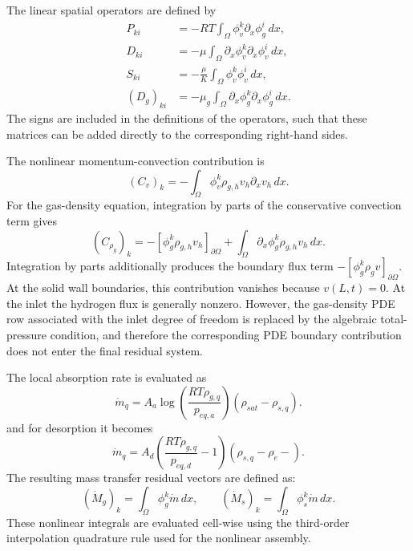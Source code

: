 The linear spatial operators are defined by
\begin{align}
P_{ki} &= -RT\int_\Omega\phi_v^k\partial_x\phi_g^i\,dx,\\
D_{ki} &= -\mu\int_\Omega\partial_x\phi_v^k\partial_x\phi_v^i\,dx,\\
S_{ki} &= -\frac{\mu}{K}\int_\Omega\phi_v^k\phi_v^i\,dx,\\
(D_g)_{ki} &= -\mu_g\int_\Omega\partial_x\phi_g^k\partial_x\phi_g^i\,dx.
\end{align}
The signs are included in the definitions of the operators, such that these matrices can be added directly to the corresponding right-hand sides.

The nonlinear momentum-convection contribution is
\begin{equation}\label{eq:model4_Cv}
(C_v)_{k}=-\int_\Omega\phi_v^k\rho_{g,h}v_h\partial_xv_h\,dx.
\end{equation}
For the gas-density equation, integration by parts of the conservative convection term gives
\begin{equation}\label{eq:model4_Crho}
(C_{\rho_g})_{k}=-\left[\phi_g^k\rho_{g,h}v_h\right]_{\partial\Omega}+
\int_\Omega\partial_x\phi_g^k\rho_{g,h}v_h\,dx.
\end{equation}
Integration by parts additionally produces the boundary flux term
$-[\phi_g^k\rho_gv]_{\partial\Omega}$. At the solid wall boundaries, this contribution vanishes because $v(L,t)=0$. At the inlet the hydrogen flux is generally nonzero. However, the gas-density PDE row associated with the inlet degree of freedom is replaced by the algebraic total-pressure condition, and therefore the corresponding PDE boundary contribution does not enter the final residual system.

The local absorption rate is evaluated as
\begin{equation}
\dot m_q=A_a\log\left(\frac{RT\rho_{g,q}}{p_{eq,a}}\right)(\rho_{sat}-\rho_{s,q}).
\end{equation}
and for desorption it becomes
\begin{equation}
\dot m_q=A_d\left(\frac{RT\rho_{g,q}}{p_{eq,d}}-1\right)(\rho_{s,q}-\rho_{e}-).
\end{equation}
The resulting mass transfer residual vectors are defined as:
\begin{equation}\label{eq:model4_absorption_vectors}
(\dot{M}_g)_{k}=\int_\Omega\phi_g^k\dot m\,dx,\qquad
(\dot{M}_s)_{k}=\int_\Omega\phi_s^k\dot m\,dx.
\end{equation}
These nonlinear integrals are evaluated cell-wise using the third-order interpolation quadrature rule used for the nonlinear assembly.

